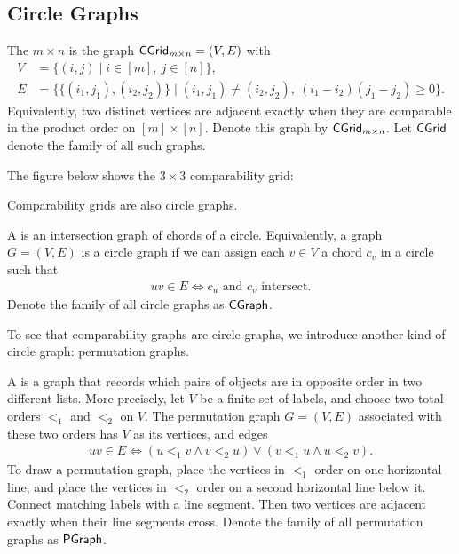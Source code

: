 \subsection{Circle Graphs}

\begin{definition}
\label{def:cgrid}
The $m \times n$  is the graph
$\mathsf{CGrid}_{m\times n}=(V,E)$ with
\begin{align}
    V &= \{(i,j) \mid i \in [m],\ j \in [n]\}, \\
    E &= \bigl\{\{(i_1,j_1),(i_2,j_2)\} \mid
    (i_1,j_1)\neq (i_2,j_2),\
    (i_1-i_2)(j_1-j_2)\ge 0
    \bigr\}.
\end{align}
Equivalently, two distinct vertices are adjacent exactly when they are comparable
in the product order on $[m]\times[n]$. Denote this graph by $\mathsf{CGrid}_{m \times n}$. Let $\mathsf{CGrid}$ denote the family of all such graphs.
\end{definition}

\begin{example}
The figure below shows the $3 \times 3$ comparability grid:

\end{example}

Comparability grids are also circle graphs.

\begin{definition}
\label{def:circle-graph}
A  is an intersection graph of chords of a circle. Equivalently, a graph $G = (V,E)$ is a circle graph if we can assign each $v \in V$ a chord $c_v$ in a circle such that 
\begin{align}
    uv \in E \iff c_u \text{ and } c_v \text{ intersect}.
\end{align}
Denote the family of all circle graphs as $\mathsf{CGraph}$.
\end{definition}

To see that comparability graphs are circle graphs, we introduce another kind of circle graph: permutation graphs.

\begin{definition}
\label{def:permutation-graph}
A  is a graph that records which pairs of objects are in opposite order in two different lists. More precisely, let $V$ be a finite set of labels, and choose two total orders $<_1$ and $<_2$ on $V$. The permutation graph $G = (V,E)$ associated with these two orders has $V$ as its vertices, and edges
\begin{align}
    uv \in E \iff (u <_1 v \land v <_2 u) \lor (v <_1 u \land u <_2 v).
\end{align}
To draw a permutation graph, place the vertices in $<_1$ order on one horizontal line, and place the vertices in $<_2$ order on a second horizontal line below it. Connect matching labels with a line segment. Then two vertices are adjacent exactly when their line segments cross. Denote the family of all permutation graphs as $\mathsf{PGraph}$.
\end{definition}

